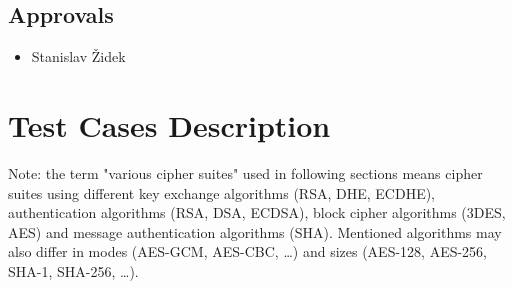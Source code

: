 \section{Approvals}
    \begin{itemize}
        \item Stanislav Židek
    \end{itemize}

\chapter{Test Cases Description} \label{ref:test-case-description}
    Note: the term "various cipher suites" used in following sections means
    cipher suites using different key exchange algorithms (RSA, DHE, ECDHE),
    authentication algorithms (RSA, DSA, ECDSA), block cipher algorithms
    (3DES, AES) and message authentication algorithms (SHA). Mentioned
    algorithms may also differ in modes (AES-GCM, AES-CBC, \dots) and sizes
    (AES-128, AES-256, SHA-1, SHA-256, \dots).

